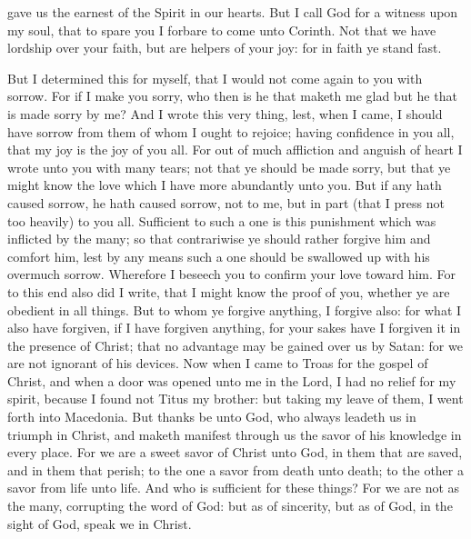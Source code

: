 gave us the earnest of the Spirit in our hearts.  But I call God for a witness upon my soul, that to spare you I forbare to come unto Corinth. Not that we have lordship over your faith, but are helpers of your joy: for in faith ye stand fast. 

But I determined this for myself, that I would not come again to you with sorrow. For if I make you sorry, who then is he that maketh me glad but he that is made sorry by me? And I wrote this very thing, lest, when I came, I should have sorrow from them of whom I ought to rejoice; having confidence in you all, that my joy is the joy of you all. For out of much affliction and anguish of heart I wrote unto you with many tears; not that ye should be made sorry, but that ye might know the love which I have more abundantly unto you.  But if any hath caused sorrow, he hath caused sorrow, not to me, but in part (that I press not too heavily) to you all. Sufficient to such a one is this punishment which was inflicted by the many; so that contrariwise ye should rather forgive him and comfort him, lest by any means such a one should be swallowed up with his overmuch sorrow. Wherefore I beseech you to confirm your love toward him. For to this end also did I write, that I might know the proof of you, whether ye are obedient in all things. But to whom ye forgive anything, I forgive also: for what I also have forgiven, if I have forgiven anything, for your sakes have I forgiven it in the presence of Christ; that no advantage may be gained over us by Satan: for we are not ignorant of his devices.  Now when I came to Troas for the gospel of Christ, and when a door was opened unto me in the Lord, I had no relief for my spirit, because I found not Titus my brother: but taking my leave of them, I went forth into Macedonia.  But thanks be unto God, who always leadeth us in triumph in Christ, and maketh manifest through us the savor of his knowledge in every place. For we are a sweet savor of Christ unto God, in them that are saved, and in them that perish; to the one a savor from death unto death; to the other a savor from life unto life. And who is sufficient for these things? For we are not as the many, corrupting the word of God: but as of sincerity, but as of God, in the sight of God, speak we in Christ. 

